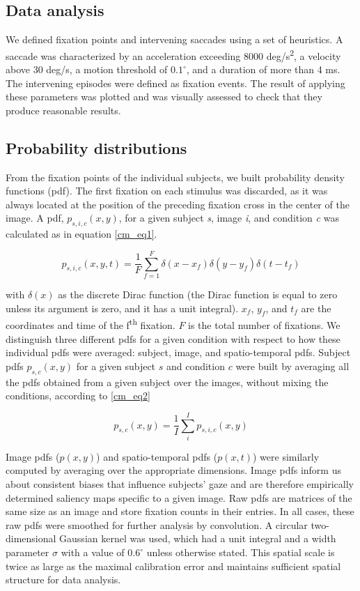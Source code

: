 \subsection{Data analysis}

We defined fixation points and intervening saccades using a set of
heuristics. A saccade was characterized by an acceleration exceeding 8000
deg/s\textsuperscript{2}, a velocity above 30 deg/s, a motion threshold of
$0.1^\circ$, and a duration of more than 4 ms. The intervening episodes
were defined as fixation events. The result of applying these parameters
was plotted and was visually assessed to check that they produce reasonable
results.

\subsection{Probability distributions}

From the fixation points of the individual subjects, we built probability
density functions (pdf). The first fixation on each stimulus was discarded,
as it was always located at the position of the preceding fixation cross in
the center of the image. A pdf, $p_{s,i,c}(x, y)$, for a given subject
\textit{s}, image \textit{i}, and condition \textit{c} was calculated as in
equation \ref{cm_eq1}.


\begin{equation}
p_{s,i,c}(x,y,t)=\frac{1}{F}\sum_{f=1}^{F}\delta(x-x_f)\delta(y-y_f)\delta(t-t_f)
\label{cm_eq1} \end{equation} 




with $\delta(x)$ as the discrete Dirac function (the Dirac function is
equal to zero unless its argument is zero, and it has a unit integral).
$x_f$, $y_f$, and $t_f$ are the coordinates and time of the
f\textsuperscript{th} fixation. $F$ is the total number of fixations. We
distinguish three different pdfs for a given condition with respect to how
these individual pdfs were averaged: subject, image, and spatio-temporal
pdfs. Subject pdfs $p_{s,c}(x,y)$ for a given subject $s$ and condition $c$
were built by averaging all the pdfs obtained from a given subject over the
images, without mixing the conditions, according to \ref{cm_eq2}

\begin{equation} p_{s,c}(x, y)=\frac{1}{I}\sum_{i}^{I}p_{s,i,c}(x,y)
\label{cm_eq2} \end{equation} 


Image pdfs ($p(x, y)$) and spatio-temporal pdfs ($p(x, t)$) were similarly
computed by averaging over the appropriate dimensions. Image pdfs inform us
about consistent biases that influence subjects' gaze and are therefore
empirically determined saliency maps specific to a given image. Raw pdfs
are matrices of the same size as an image and store fixation counts in
their entries. In all cases, these raw pdfs were smoothed for further
analysis by convolution. A circular two-dimensional Gaussian kernel was
used, which had a unit integral and a width parameter $\sigma$ with a value
of $0.6^\circ$ unless otherwise stated. This spatial scale is twice as
large as the maximal calibration error and maintains sufficient spatial
structure for data analysis.


